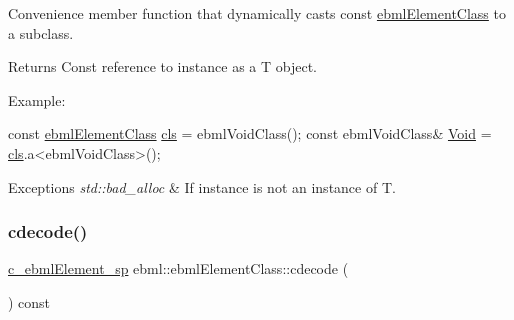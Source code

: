Convenience member function that dynamically casts const \mbox{\hyperlink{classebml_1_1ebmlElementClass}{ebml\+Element\+Class}} to a subclass.

\begin{DoxyReturn}{Returns}
Const reference to instance as a T object.
\end{DoxyReturn}
Example\+: 
\begin{DoxyCode}
\textcolor{keyword}{const} \mbox{\hyperlink{classebml_1_1ebmlElementClass_a6c2081870c5d66c70e0cf988ff253420}{ebmlElementClass}} \mbox{\hyperlink{classebml_1_1ebmlElement_a15cf59e94b01e2c49ec96512b9bd9d90}{cls}} = ebmlVoidClass();
\textcolor{keyword}{const} ebmlVoidClass& \mbox{\hyperlink{namespaceebml_afbfd509d1cb71e416a07253746e886e9}{Void}} = \mbox{\hyperlink{classebml_1_1ebmlElement_a15cf59e94b01e2c49ec96512b9bd9d90}{cls}}.a<ebmlVoidClass>();
\end{DoxyCode}
 
\begin{DoxyExceptions}{Exceptions}
{\em std\+::bad\+\_\+alloc} & If instance is not an instance of T. \\
\hline
\end{DoxyExceptions}
\mbox{\label{classebml_1_1ebmlElementClass_ad44d7844db705e5e1d8c35a780b58486}} 
\subsubsection{\texorpdfstring{cdecode()}{cdecode()}\hspace{0.1cm}{\footnotesize\ttfamily [1/6]}}
{\footnotesize\ttfamily \mbox{\hyperlink{namespaceebml_a2deef4e8071531b32e3533f1bf978917}{c\+\_\+ebml\+Element\+\_\+sp}} ebml\+::ebml\+Element\+Class\+::cdecode (\begin{DoxyParamCaption}\item[{const \mbox{\hyperlink{classebml_1_1parseString}{parse\+String}} \&}]{ }\end{DoxyParamCaption}) const}

\mbox{\label{classebml_1_1ebmlElementClass_a6a6432b7bf633821f27015e111928b15}} 
